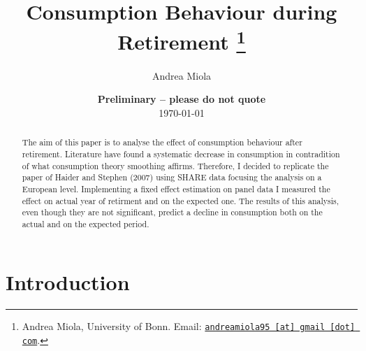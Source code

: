 \documentclass[11pt, a4paper, leqno]{article}
\begin{document}
\title{Consumption Behaviour during Retirement \thanks{Andrea Miola, University of Bonn. Email: \href{mailto:andreamiola95@gmail.com}{\nolinkurl{andreamiola95 [at] gmail [dot] com}}.}}

\author{Andrea Miola}

\date{
{\bf Preliminary -- please do not quote}
\\[1ex]
\today
}

\maketitle


\begin{abstract}
The aim of this paper is to analyse the effect of consumption behaviour after retirement. Literature have found a systematic decrease in consumption in contradition of what consumption theory smoothing affirms. Therefore, I decided to replicate the paper of Haider and Stephen (2007) using SHARE data focusing the analysis on a European level. Implementing a fixed effect estimation on panel data I measured the effect on actual year of retirment and on the expected one. The results of this analysis, even though they are not significant, predict a decline in consumption both on the actual and on the expected period.

\end{abstract}
\clearpage

\section{Introduction} %
\label{sec:introduction}
\end{document}
